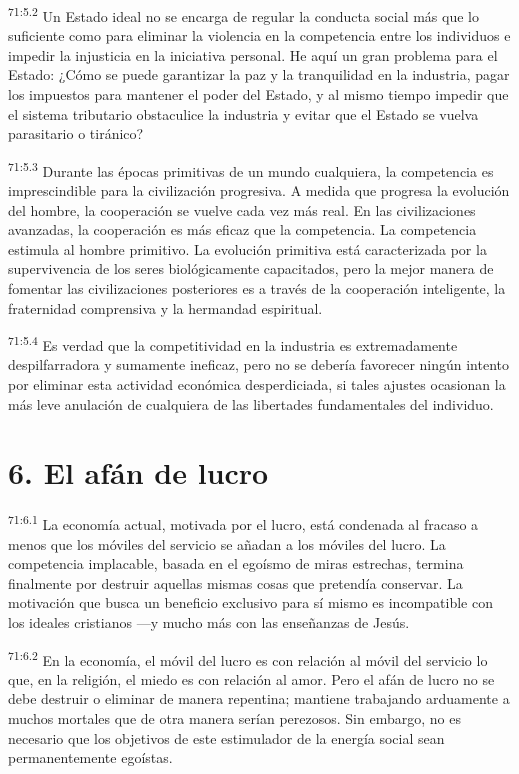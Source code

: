 \par
\textsuperscript{71:5.2} Un Estado ideal no se encarga de regular la conducta social más que lo suficiente como para eliminar la violencia en la competencia entre los individuos e impedir la injusticia en la iniciativa personal. He aquí un gran problema para el Estado: ¿Cómo se puede garantizar la paz y la tranquilidad en la industria, pagar los impuestos para mantener el poder del Estado, y al mismo tiempo impedir que el sistema tributario obstaculice la industria y evitar que el Estado se vuelva parasitario o tiránico?

\par
\textsuperscript{71:5.3} Durante las épocas primitivas de un mundo cualquiera, la competencia es imprescindible para la civilización progresiva. A medida que progresa la evolución del hombre, la cooperación se vuelve cada vez más real. En las civilizaciones avanzadas, la cooperación es más eficaz que la competencia. La competencia estimula al hombre primitivo. La evolución primitiva está caracterizada por la supervivencia de los seres biológicamente capacitados, pero la mejor manera de fomentar las civilizaciones posteriores es a través de la cooperación inteligente, la fraternidad comprensiva y la hermandad espiritual.

\par
\textsuperscript{71:5.4} Es verdad que la competitividad en la industria es extremadamente despilfarradora y sumamente ineficaz, pero no se debería favorecer ningún intento por eliminar esta actividad económica desperdiciada, si tales ajustes ocasionan la más leve anulación de cualquiera de las libertades fundamentales del individuo.

\section*{6. El afán de lucro}
\par
\textsuperscript{71:6.1} La economía actual, motivada por el lucro, está condenada al fracaso a menos que los móviles del servicio se añadan a los móviles del lucro. La competencia implacable, basada en el egoísmo de miras estrechas, termina finalmente por destruir aquellas mismas cosas que pretendía conservar. La motivación que busca un beneficio exclusivo para sí mismo es incompatible con los ideales cristianos ---y mucho más con las enseñanzas de Jesús.

\par
\textsuperscript{71:6.2} En la economía, el móvil del lucro es con relación al móvil del servicio lo que, en la religión, el miedo es con relación al amor. Pero el afán de lucro no se debe destruir o eliminar de manera repentina; mantiene trabajando arduamente a muchos mortales que de otra manera serían perezosos. Sin embargo, no es necesario que los objetivos de este estimulador de la energía social sean permanentemente egoístas.

